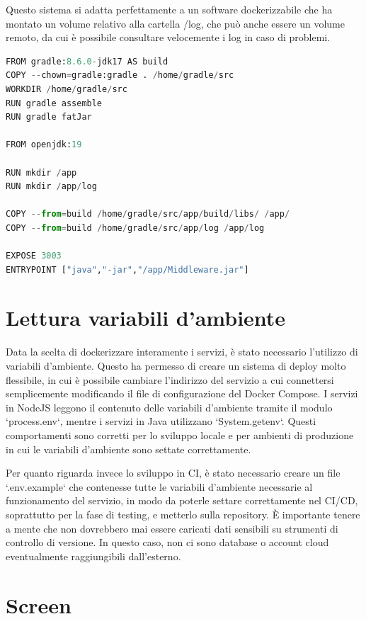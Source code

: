 Questo sistema si adatta perfettamente a un software dockerizzabile che ha montato un volume relativo alla cartella /log, che può anche essere un volume remoto, da cui è possibile consultare velocemente i log in caso di problemi.

\begin{lstlisting}[language=Python, caption={Volume di log nel dockerfile l.13 da montare successivamente}, label=list:dockerfile_log]
FROM gradle:8.6.0-jdk17 AS build
COPY --chown=gradle:gradle . /home/gradle/src
WORKDIR /home/gradle/src
RUN gradle assemble
RUN gradle fatJar 

FROM openjdk:19

RUN mkdir /app
RUN mkdir /app/log

COPY --from=build /home/gradle/src/app/build/libs/ /app/
COPY --from=build /home/gradle/src/app/log /app/log

EXPOSE 3003
ENTRYPOINT ["java","-jar","/app/Middleware.jar"]
\end{lstlisting}

\section{Lettura variabili d'ambiente}

Data la scelta di dockerizzare interamente i servizi, è stato necessario l'utilizzo di variabili d'ambiente. Questo ha permesso di creare un sistema di deploy molto flessibile, in cui è possibile cambiare l'indirizzo del servizio a cui connettersi semplicemente modificando il file di configurazione del Docker Compose. I servizi in NodeJS leggono il contenuto delle variabili d'ambiente tramite il modulo `process.env`, mentre i servizi in Java utilizzano `System.getenv`. Questi comportamenti sono corretti per lo sviluppo locale e per ambienti di produzione in cui le variabili d'ambiente sono settate correttamente.

Per quanto riguarda invece lo sviluppo in CI, è stato necessario creare un file `.env.example` che contenesse tutte le variabili d'ambiente necessarie al funzionamento del servizio, in modo da poterle settare correttamente nel CI/CD, soprattutto per la fase di testing, e metterlo sulla repository. È importante tenere a mente che non dovrebbero mai essere caricati dati sensibili su strumenti di controllo di versione. In questo caso, non ci sono database o account cloud eventualmente raggiungibili dall'esterno.

\section{Screen}
